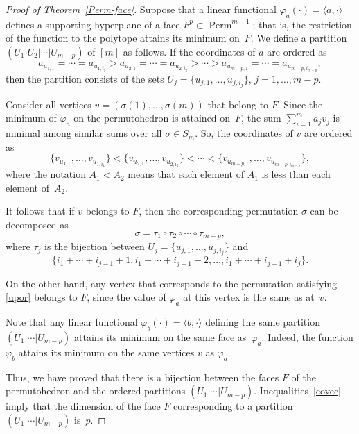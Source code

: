 \documentclass[a4paper,12pt]{amsart}
\theoremstyle{definition}
\theoremstyle{remark}
\numberwithin{equation}{section}
\DeclareMathOperator{\Perm}{Perm}
\begin{document}
\begin{proof}[Proof of Theorem~\ref{Perm-face}]
Suppose that a linear functional $\varphi_a(\cdot) = \langle a, \cdot \rangle$
defines a supporting hyperplane of a face $F^p \subset \Perm^{m-1}$;
that is, the restriction of the function to the polytope attains its minimum on~$F$.
We define a partition $(U_1 | U_2 | \cdots | U_{m-p})$ of $[m]$
as follows. If the coordinates of $a$ are ordered as
\begin{equation}\label{covec}
a_{u_{1, 1}} = \cdots = a_{u_{1, i_1}} > a_{u_{2, 1}} = \cdots = a_{u_{2, i_2}} > \cdots > a_{u_{m-p, 1}} = \cdots = a_{u_{m-p, i_{m-p}}},
\end{equation}
then the partition consists of the sets $U_j = \{u_{j, 1}, \ldots, u_{j, i_j} \}$, $j = 1, \ldots, m-p$. 

Consider all vertices $v = (\sigma(1), \ldots, \sigma(m))$ that belong to $F$. 
Since the minimum of $\varphi_a$ on the permutohedron is attained on~$F$,
the sum $\sum_{i = 1}^m a_j v_j$ is minimal among similar sums over all $\sigma \in S_m$.
So, the coordinates of $v$ are ordered as
\begin{equation}\label{nerva}
\{ v_{u_{1, 1}}, \ldots, v_{u_{1, i_1}} \} < \{ v_{u_{2, 1}}, \ldots, v_{u_{2, i_2}} \} < \cdots < \{ v_{u_{m-p, 1}}, \ldots, v_{u_{m-p, i_{m-p}}} \},
\end{equation}
where the notation $A_1 < A_2$ means that each element of $A_1$ is less than each element of~$A_2$.

It follows that if $v$ belongs to $F$, then the corresponding permutation $\sigma$ 
can be decomposed as
\begin{equation}\label{upor}
\sigma = \tau_1 \circ \tau_2 \circ \cdots \circ \tau_{m-p},
\end{equation}
where $\tau_j$ is the bijection between $U_j = \{u_{j, 1}, \ldots, u_{j, i_j} \}$
and
$$\{i_1 + \cdots + i_{j-1} + 1, i_1 + \cdots + i_{j-1} + 2, \ldots, i_1 + \cdots + i_{j-1} + i_j  \}.$$

On the other hand, any vertex that corresponds to the permutation satisfying \eqref{upor} belongs to $F$, 
since the value of $\varphi_a$ at this vertex is the same as at~$v$.

Note that any linear functional $\varphi_b(\cdot) = \langle b, \cdot \rangle$ 
defining the same partition $(U_1 | \cdots | U_{m-p})$
attains its minimum on the same face as~$\varphi_a$.
Indeed, the function $\varphi_b$ attains its minimum on the same vertices $v$ as $\varphi_a$.

Thus, we have proved that there is a bijection between the faces $F$ of the permutohedron and the ordered partitions $(U_1 | \cdots | U_{m-p})$.
Inequalities~\eqref{covec} imply that the dimension of the face $F$ corresponding to a partition $(U_1 | \cdots | U_{m-p})$ is~$p$.
\end{proof}
\end{document}
